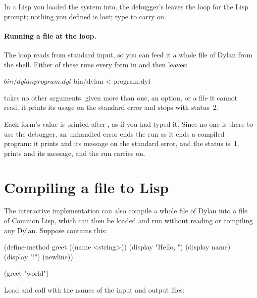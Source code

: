 \begin{notebox}
In a Lisp you loaded the system into, the debugger's  leaves
the loop for the Lisp \code{*} prompt; nothing you defined is lost; type
 to carry on.
\end{notebox}

\paragraph{Running a file at the loop.} The loop reads from standard
input, so you can feed it a whole file of Dylan from the shell. Either of
these runs every form in  and then leaves:

\begin{shell}
$ bin/dylan program.dyl
$ bin/dylan < program.dyl
\end{shell}

\noindent {} takes no other arguments: given more than one,
an option, or a file it cannot read, it prints its usage on the standard
error and stops with status~2.

Each form's value is printed after , as if you had typed it.
Since no one is there to use the debugger, an unhandled error ends the run
as it ends a compiled program: it prints  and its
message on the standard error, and the status is~1.  prints
 and its message, and the run carries on.

\section{Compiling a file to Lisp}\label{sec:start-compile-file}

The interactive implementation can also compile a whole file of Dylan
into a file of Common Lisp, which can then be loaded and run without
reading or compiling any Dylan. Suppose  contains this:

\begin{dylan}
(define-method greet ((name <string>))
  (display "Hello, ")
  (display name)
  (display "!")
  (newline))

(greet "world")
\end{dylan}

Load  and call 
with the names of the input and output files:


